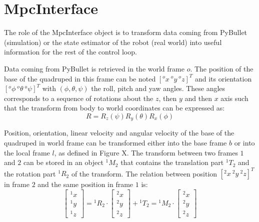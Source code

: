\documentclass[a4paper,11pt]{article}
\newcommand{\fM}[2]{{}^{#1}\!M_{#2}}
\begin{document}

\section{MpcInterface}

The role of the MpcInterface object is to transform data coming from PyBullet (simulation) or the state estimator of the robot (real world) into useful information for the rest of the control loop. 

Data coming from PyBullet is retrieved in the world frame $o$. The position of the base of the quadruped in this frame can be noted $[{}^o\!x ~ {}^o\!y ~ {}^o\!z]^T$ and its orientation $[{}^o\!\phi ~ {}^o\!\theta ~ {}^o\!\psi]^T$ with $(\phi, \theta, \psi)$ the roll, pitch and yaw angles. These angles corresponds to a sequence of rotations about the $z$, then $y$ and then $x$ axis such that the transform from body to world coordinates can be expressed as:
\begin{equation}
	R = R_z(\psi) R_y(\theta) R_x(\phi)
\end{equation}

Position, orientation, linear velocity and angular velocity of the base of the quadruped in world frame can be transformed either into the base frame $b$ or into the local frame $l$, as defined in Figure X. The transform between two frames $1$ and $2$ can be stored in an object $\fM{1}{2}$ that contains the translation part $^1\!T_2$ and the rotation part $^1\!R_2$ of the transform. The relation between position $[^2\!x ~ ^2\!y ~ ^2\!z]^T$ in frame $2$ and the same position in frame $1$ is:
\begin{equation}
\begin{bmatrix}^1\!x \\ ^1\!y \\ ^1\!z \end{bmatrix} = {}^1\!R_2 \cdot \begin{bmatrix}^2\!x \\ ^2\!y \\ ^2\!z\end{bmatrix} + {}^1\!T_2 = \fM{1}{2} \cdot \begin{bmatrix}^2\!x \\ ^2\!y \\ ^2\!z\end{bmatrix}
\end{equation}  
\end{document}
